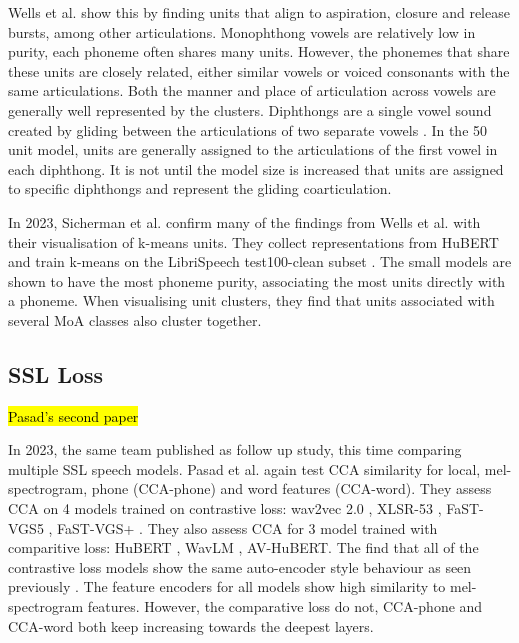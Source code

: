 Wells et al. \cite{wells2022phonetic} show this by finding units that align to aspiration, closure and release bursts, among other articulations. Monophthong vowels are relatively low in purity, each phoneme often shares many units. However, the phonemes that share these units are closely related, either similar vowels or voiced consonants with the same articulations. Both the manner and place of articulation across vowels are generally well represented by the clusters. Diphthongs are a single vowel sound created by gliding between the articulations of two separate vowels \cite{ipahandbook_1999}. In the 50 unit model, units are generally assigned to the articulations of the first vowel in each diphthong. It is not until the model size is increased that units are assigned to specific diphthongs and represent the gliding coarticulation.

In 2023, Sicherman et al. \cite{sicherman2023analysingdiscrete} confirm many of the findings from Wells et al. \cite{wells2022phonetic} with their visualisation of k-means units. They collect representations from HuBERT \cite{hsu2021hubert} and train k-means on the LibriSpeech test100-clean subset \cite{librispeech}. The small models are shown to have the most phoneme purity, associating the most units directly with a phoneme. When visualising unit clusters, they find that units associated with several MoA classes also cluster together. 

\subsection{SSL Loss}

\hl{Pasad's second paper}

In 2023, the same team published as follow up study, this time comparing multiple SSL speech models. Pasad et al. \cite{pasad2023comparative} again test CCA similarity for local, mel-spectrogram, phone (CCA-phone) and word features (CCA-word). They assess CCA on 4 models trained on contrastive loss: wav2vec 2.0 \cite{wav2vec}, XLSR-53 \cite{XLSR-53}, FaST-VGS5 \cite{fastvgspeng2022}, FaST-VGS+ \cite{peng2022self}. They also assess CCA for 3 model trained with comparitive loss: HuBERT \cite{hsu2021hubert}, WavLM \cite{chen2022wavlm}, AV-HuBERT\cite{shi2022learning}. The find that all of the contrastive loss models show the same auto-encoder style behaviour as seen previously \cite{pasad2021layer}. The feature encoders for all models show high similarity to mel-spectrogram features. However, the comparative loss do not, CCA-phone and CCA-word both keep increasing towards the deepest layers. 

